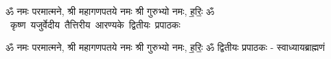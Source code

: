 \documentclass[17pt]{extarticle}
\begin{document}
\begin{titlepage}
    \begin{center}
 
\begin{sanskrit}
    { \Large
    ॐ नमः परमात्मने, श्री महागणपतये नमः
श्री गुरुभ्यो नमः, ह॒रिः॒ ॐ 
    }
    \\
    \vspace{2.5cm}
    \mbox{ \Huge
    कृष्ण यजुर्वेदीय तैत्तिरीय आरण्यके द्वितीयः प्रपाठकः   }
\end{sanskrit}
\end{center}

\end{titlepage}
\tableofcontents

ॐ नमः परमात्मने, श्री महागणपतये नमः
श्री गुरुभ्यो नमः, ह॒रिः॒ ॐ      द्वितीयः प्रपाठकः - स्वाध्यायब्राह्मणं \newline

\end{document}
